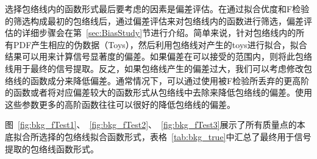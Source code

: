 选择包络线内的函数形式最后要考虑的因素是偏差评估。在通过拟合优度和F检验的筛选构成最初的包络线后，通过偏差评估来对包络线内的函数进行筛选，偏差评估的详细步骤会在第~\ref{sec:BiasStudy}节进行介绍。简单来说，针对包络线内的所有PDF产生相应的伪数据（Toys），然后利用包络线对产生的toys进行拟合，拟合结果可以用来计算信号显著度的偏差。如果偏差在可以接受的范围内，则将此包络线用于最终的信号提取。反之，如果包络线产生的偏差过大，我们可以考虑修改包络线的函数成分来降低偏差。通常情况下，可以通过使用被F检验所丢弃的更高阶的函数或者将对应偏差较大的函数形式从包络线中去除来降低包络线的偏差。使用这些参数更多的高阶函数往往可以很好的降低包络线的偏差。

图~\ref{fig:bkg_fTest1}、~\ref{fig:bkg_fTest2}、~\ref{fig:bkg_fTest3}展示了所有质量点的本底拟合所选择的包络线拟合函数形式，表格~\ref{tab:bkg_true}中汇总了最终用于信号提取的包络线函数形式。


